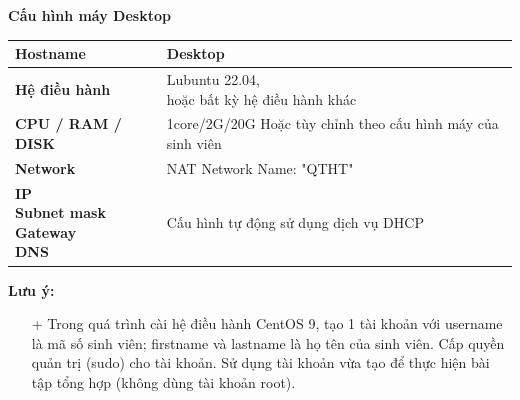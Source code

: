 \begin{itemize}
\begin{minipage}{\linewidth}
\begin{multicols}{2}
        \begin{minipage}{\linewidth}
          \captionsetup{type=table}
          \caption{\bfseries Cấu hình máy Desktop}
          \centering
          \begin{tabular}{| m{.46\linewidth} | m{.42\linewidth} |}
            \hline
            \textbf{Hostname}                                                                              & Desktop                                                                                 \\\hline
            \parbox[c][2.5cm][c]{\linewidth}{\textbf{Hệ điều hành}}                                        & \parbox[c][2.5cm][c]{\linewidth}{Lubuntu 22.04, \newline hoặc bất kỳ hệ điều hành khác} \\\hline
            \textbf{CPU / RAM / DISK}                                                                      & 1core/2G/20G \newline Hoặc tùy chỉnh theo cấu hình máy của sinh viên                    \\\hline
            \textbf{Network}                                                                               & NAT Network \newline Name: "QTHT"                                                       \\\hline
            \parbox[c][4cm][c]{\linewidth}{\textbf{IP \newline Subnet mask \newline Gateway \newline DNS}} & \parbox[c][4cm][c]{\linewidth}{Cấu hình tự động sử dụng dịch vụ DHCP}                   \\\hline
          \end{tabular}
        \end{minipage}
      \end{multicols}
    \end{minipage}

    \vspace{.3cm}
    \textbf{Lưu ý:}
    \begin{itemize}
      \item[+] Trong quá trình cài hệ điều hành CentOS 9, tạo 1 tài khoản với username là mã số sinh viên; firstname và lastname là họ tên của sinh viên. Cấp quyền quản trị (sudo) cho tài khoản. Sử dụng tài khoản vừa tạo để thực hiện bài tập tổng hợp (không dùng tài khoản root).
    \end{itemize}
\end{itemize}

